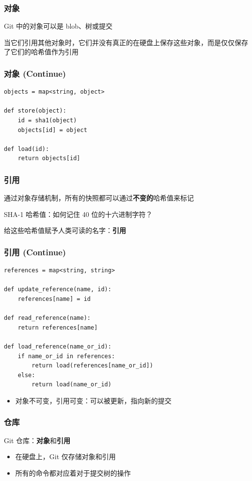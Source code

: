 \documentclass[UTF8, 16pt]{beamer}
\begin{document}
\begin{frame}
    \frametitle{对象}
    \textcolor{sufered}{Git 中的对象可以是 blob、树或提交}

    当它们引用其他对象时，它们并没有真正的在硬盘上保存这些对象，而是仅仅保存了它们的哈希值作为引用
\end{frame}

\begin{frame}[fragile]
    \frametitle{对象 (Continue)}
    \begin{lstlisting}
objects = map<string, object>

def store(object):
    id = sha1(object)
    objects[id] = object

def load(id):
    return objects[id]
    \end{lstlisting}
\end{frame}

\begin{frame}
    \frametitle{引用}
    通过对象存储机制，所有的快照都可以通过\textbf{不变的}哈希值来标记
    
    SHA-1 哈希值：如何记住 40 位的十六进制字符？
    
    \textcolor{sufered}{给这些哈希值赋予人类可读的名字：\textbf{引用}}
\end{frame}

\begin{frame}[fragile]
    \frametitle{引用 (Continue)}
    \begin{lstlisting}
references = map<string, string>

def update_reference(name, id):
    references[name] = id

def read_reference(name):
    return references[name]

def load_reference(name_or_id):
    if name_or_id in references:
        return load(references[name_or_id])
    else:
        return load(name_or_id)
    \end{lstlisting}

    \begin{itemize}
        \item 对象不可变，引用可变：可以被更新，指向新的提交
    \end{itemize}
\end{frame}

\begin{frame}
    \frametitle{仓库}
    \textcolor{sufered}{Git 仓库：\textbf{对象}和\textbf{引用}}

    \begin{itemize}
        \item 在硬盘上，Git 仅存储对象和引用
        \item 所有的命令都对应着对于提交树的操作
    \end{itemize}
\end{frame}
\end{document}
